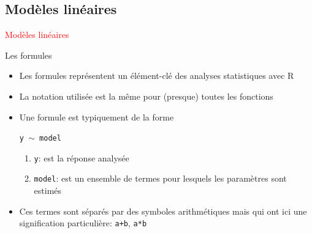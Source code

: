 \documentclass[11pt]{beamer}\usepackage[]{graphicx}\usepackage[]{color}
\makeatletter
\newcommand{\hlcom}[1]{\textcolor[rgb]{0.588,0.588,0.588}{#1}}%
\newcommand{\hlopt}[1]{\textcolor[rgb]{0.196,0.196,0.196}{#1}}%
\newcommand{\hlstd}[1]{\textcolor[rgb]{0.196,0.196,0.196}{#1}}%
\newcommand{\hlkwb}[1]{\textcolor[rgb]{0.627,0,0.314}{#1}}%
\newcommand{\hlkwc}[1]{\textcolor[rgb]{0,0.631,0.314}{#1}}%
\newcommand{\hlkwd}[1]{\textcolor[rgb]{0.78,0.227,0.412}{#1}}%
\newenvironment{kframe}{%
 \def\at@end@of@kframe{}%
 \ifinner\ifhmode%
  \def\at@end@of@kframe{\end{minipage}}%
  \begin{minipage}{\columnwidth}%
 \fi\fi%
 \def\FrameCommand##1{\hskip\@totalleftmargin \hskip-\fboxsep
 \colorbox{shadecolor}{##1}\hskip-\fboxsep
     \hskip-\linewidth \hskip-\@totalleftmargin \hskip\columnwidth}%
 \MakeFramed {\advance\hsize-\width
   \@totalleftmargin\z@ \linewidth\hsize
   \@setminipage}}%
 {\par\unskip\endMakeFramed%
 \at@end@of@kframe}
\newenvironment{knitrout}{}{} %
\newtheorem{rcode}{R code}[section]
\newcommand{\code}[1]{\texttt{#1}}
\makeatother
\begin{document}




\subsection{Modèles linéaires}

\begin{frame}
 \begin{center}
  \Huge{\textcolor{red}{Modèles linéaires}}
 \end{center}
\end{frame}


\begin{frame}[fragile]{Les formules}

\begin{itemize}
  \setlength\itemsep{1.5em}
  \item Les formules représentent un élément-clé des analyses statistiques avec R
  \pause \item La notation utilisée est la m\^{e}me pour (presque) toutes les fonctions
  \pause \item Une formule est typiquement de la forme 
  \begin{center}
  \code{y $\sim$ model}
  \end{center} 
  \pause \begin{enumerate}
  \item \code{y}: est la réponse analysée 
  \item \code{model}: est un ensemble de termes pour lesquels les paramètres sont estimés
  \end{enumerate}
  \pause \item Ces termes sont séparés par des symboles arithmétiques mais qui ont ici une signification
  particulière: \code{a+b}, \code{a*b}
 \end{itemize}
\end{frame}
\end{document}
